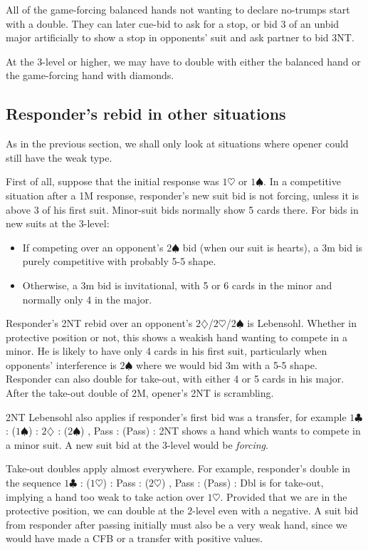 \documentclass{article}
\newcommand{\sz}{\spadesuit}
\newcommand{\hz}{\heartsuit}
\newcommand{\dz}{\diamondsuit}
\newcommand{\cz}{\clubsuit}
\begin{document}
All of the game-forcing balanced hands not wanting to declare no-trumps start with a double. They can later cue-bid to ask for a stop, or bid 3 of an unbid major artificially to show a stop in opponents' suit and ask partner to bid 3NT.

At the 3-level or higher, we may have to double with either the balanced hand or the game-forcing hand with diamonds.

\subsection{Responder's rebid in other situations}

As in the previous section, we shall only look at situations where opener could still have the weak type.

First of all, suppose that the initial response was $1\hz$ or $1\sz$. In a competitive situation after a 1M response, responder's new suit bid is not forcing, unless it is above 3 of his first suit. Minor-suit bids normally show 5 cards there. For bids in new suits at the 3-level:
\begin{itemize}
\item If competing over an opponent's $2\sz$ bid (when our suit is hearts), a 3m bid is purely competitive with probably 5-5 shape.
\item Otherwise, a 3m bid is invitational, with 5 or 6 cards in the minor and normally only 4 in the major.
\end{itemize}
Responder's 2NT rebid over an opponent's $2\dz$/$2\hz$/$2\sz$ is Lebensohl. Whether in protective position or not, this shows a weakish hand wanting to compete in a minor. He is likely to have only 4 cards in his first suit, particularly when opponents' interference is $2\sz$ where we would bid 3m with a 5-5 shape. Responder can also double for take-out, with either 4 or 5 cards in his major. After the take-out double of 2M, opener's 2NT is scrambling.

2NT Lebensohl also applies if responder's first bid was a transfer, for example $1\cz$ : ($1\sz$) : $2\dz$ : ($2\sz$) , Pass : (Pass) : 2NT  shows a hand which wants to compete in a minor suit. A new suit bid at the 3-level would be \emph{forcing}.

Take-out doubles apply almost everywhere. For example, responder's double in the sequence $1\cz$ : ($1\hz$) : Pass : ($2\hz$) , Pass : (Pass) : Dbl is for take-out, implying a hand too weak to take action over $1\hz$. Provided that we are in the protective position, we can double at the 2-level even with a negative. A suit bid from responder after passing initially must also be a very weak hand, since we would have made a CFB or a transfer with positive values.
\end{document}
